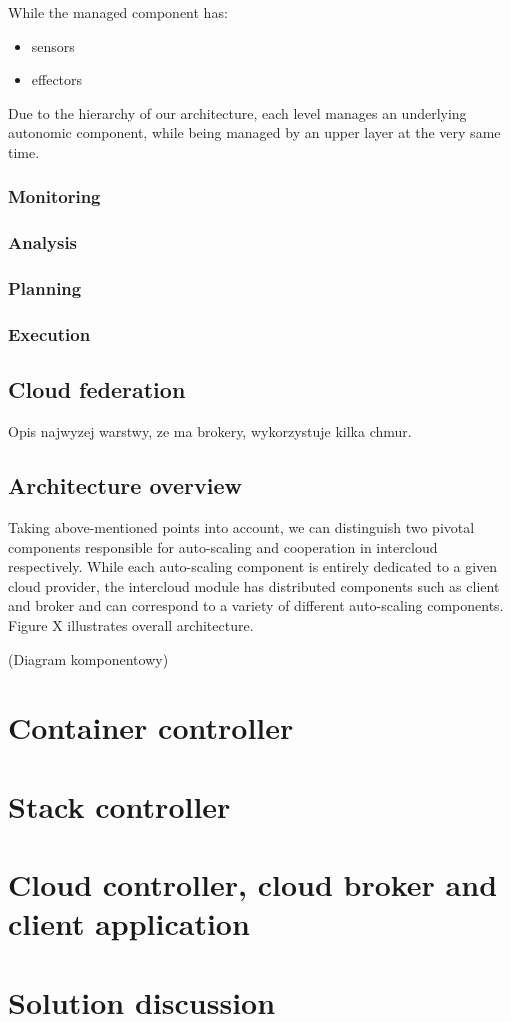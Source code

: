 While the managed component has:
\begin{itemize}
	\item sensors
	\item effectors
\end{itemize}

Due to the hierarchy of our architecture, each level manages an underlying autonomic component, while being managed by an upper layer at the very same time.

\subsubsection{Monitoring}

\subsubsection{Analysis}

\subsubsection{Planning}

\subsubsection{Execution}

\subsection{Cloud federation}
Opis najwyzej warstwy, ze ma brokery, wykorzystuje kilka chmur.

\subsection{Architecture overview}
Taking above-mentioned points into account, we can distinguish two pivotal components responsible for auto-scaling and cooperation in intercloud respectively. While each auto-scaling component is entirely dedicated to a given cloud provider, the intercloud module has distributed components such as client and broker and can correspond to a variety of different auto-scaling components. Figure X illustrates overall architecture.

(Diagram komponentowy)

\section{Container controller}

\section{Stack controller}

\section{Cloud controller, cloud broker and client application}

\section{Solution discussion}
